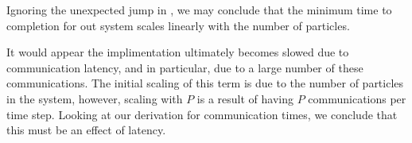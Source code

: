 Ignoring the unexpected jump in 
,
we may conclude that the minimum time to completion for out system
scales linearly with the number of particles.

It would appear the implimentation ultimately becomes slowed due to
communication latency, and in particular, due to a large number
of these communications.
%
The initial scaling of this term is due to the number of particles
in the system, however,
scaling with $P$ is a result of having $P$ communications
per time step.
%
Looking at our derivation for communication times,
we conclude that this must be an effect of latency.
